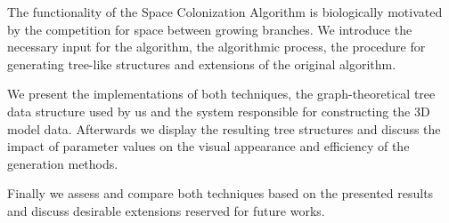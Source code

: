  The functionality of the Space Colonization Algorithm is biologically motivated by the competition for space between growing branches. We introduce the necessary input for the algorithm, the algorithmic process, the procedure for generating tree-like structures and extensions of the original algorithm.
 
 We present the implementations of both techniques, the graph-theoretical tree data structure used by us and the system responsible for constructing the 3D model data. Afterwards we display the resulting tree structures and discuss the impact of parameter values on the visual appearance and efficiency of the generation methods.
 
 Finally we assess and compare both techniques based on the presented results and discuss desirable extensions reserved for future works.


